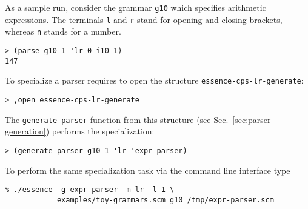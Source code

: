 \documentclass{article}
\newcommand{\codefont}[1]{\texttt{#1}}
\begin{document}
As a sample run, consider the grammar \codefont{g10} which specifies arithmetic 
expressions. The terminals \codefont{l} and \codefont{r} stand for opening
and closing brackets, whereas \codefont{n} stands for a number.
\begin{verbatim}
> (parse g10 1 'lr 0 i10-1)
147
\end{verbatim}

To specialize a parser requires to open the structure
\codefont{essence-cps-lr-generate}:
\begin{verbatim}
> ,open essence-cps-lr-generate
\end{verbatim}
The \codefont{generate-parser} function from this structure (see
Sec.~\ref{sec:parser-generation}) performs the specialization:
\begin{verbatim}
> (generate-parser g10 1 'lr 'expr-parser)
\end{verbatim}

To perform the same specialization task via the command line interface type
\begin{verbatim}
% ./essence -g expr-parser -m lr -l 1 \
            examples/toy-grammars.scm g10 /tmp/expr-parser.scm
\end{verbatim}

 

\end{document}
